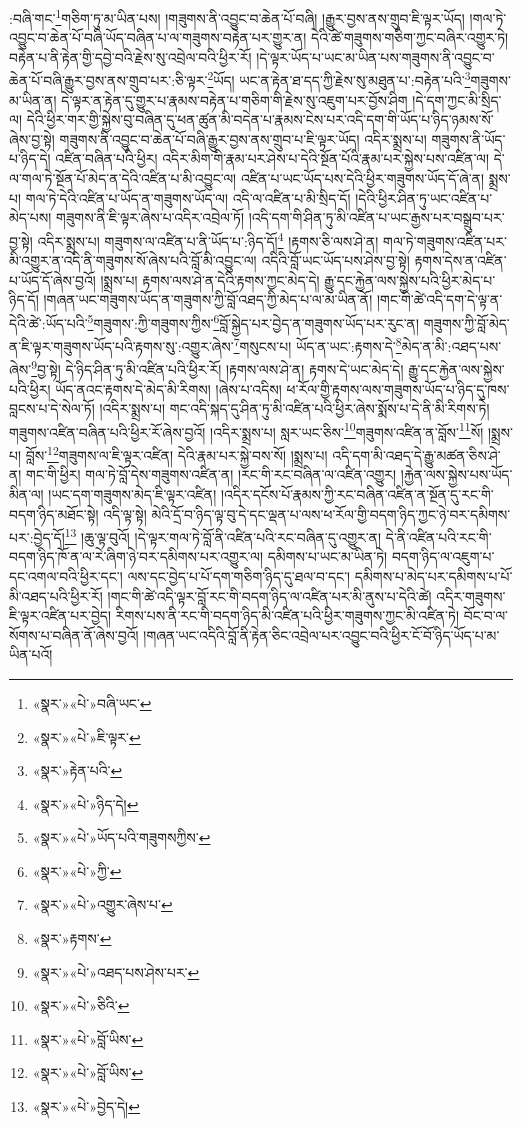 :བཞི་གང་\footnote{«སྣར་»«པེ་»བཞི་ཡང་}གཅིག་ཏུ་མ་ཡིན་པས། །གཟུགས་ནི་འབྱུང་བ་ཆེན་པོ་བཞི། །རྒྱུར་བྱས་ནས་གྲུབ་ཇི་ལྟར་ཡོད། །གལ་ཏེ་འབྱུང་བ་ཆེན་པོ་བཞི་ཡོད་བཞིན་པ་ལ་གཟུགས་བརྟེན་པར་གྱུར་ན། དེའི་ཚེ་གཟུགས་གཅིག་ཀྱང་བཞིར་འགྱུར་ཏེ། བརྟེན་པ་ནི་རྟེན་གྱི་དབྱེ་བའི་རྗེས་སུ་འབྲེལ་བའི་ཕྱིར་རོ། །དེ་ལྟར་ཡོད་པ་ཡང་མ་ཡིན་པས་གཟུགས་ནི་འབྱུང་བ་ཆེན་པོ་བཞི་རྒྱུར་བྱས་ནས་གྲུབ་པར་:ཅི་ལྟར་\footnote{«སྣར་»«པེ་»ཇི་ལྟར་}ཡོད། ཡང་ན་རྟེན་ཐ་དད་ཀྱི་རྗེས་སུ་མཐུན་པ་:བརྟེན་པའི་\footnote{«སྣར་»རྟེན་པའི་}གཟུགས་མ་ཡིན་ན། དེ་ལྟར་ན་རྟེན་དུ་གྱུར་པ་རྣམས་བརྟེན་པ་གཅིག་གི་རྗེས་སུ་འཇུག་པར་བྱོས་ཤིག །དེ་དག་ཀྱང་མི་སྲིད་ལ། དེའི་ཕྱིར་གར་གྱི་སྐྱེས་བུ་བཞིན་དུ་ཕན་ཚུན་མི་བདེན་པ་རྣམས་ངེས་པར་འདི་དག་གི་ཡོད་པ་ཉིད་ཉམས་སོ་ཞེས་བྱ་སྟེ། གཟུགས་ནི་འབྱུང་བ་ཆེན་པོ་བཞི་རྒྱུར་བྱས་ནས་གྲུབ་པ་ཇི་ལྟར་ཡོད། འདིར་སྨྲས་པ། གཟུགས་ནི་ཡོད་པ་ཉིད་དེ། འཛིན་བཞིན་པའི་ཕྱིར། འདིར་མིག་གི་རྣམ་པར་ཤེས་པ་དེའི་སྔོན་པོའི་རྣམ་པར་སྐྱེས་པས་འཛིན་ལ། དེ་ལ་གལ་ཏེ་སྔོན་པོ་མེད་ན་དེའི་འཛིན་པ་མི་འབྱུང་ལ། འཛིན་པ་ཡང་ཡོད་པས་དེའི་ཕྱིར་གཟུགས་ཡོད་དོ་ཞེ་ན། སྨྲས་པ། གལ་ཏེ་དེའི་འཛིན་པ་ཡོད་ན་གཟུགས་ཡོད་ལ། འདི་ལ་འཛིན་པ་མི་སྲིད་དོ། །དེའི་ཕྱིར་ཤིན་ཏུ་ཡང་འཛིན་པ་མེད་པས། གཟུགས་ནི་ཇི་ལྟར་ཞེས་པ་འདིར་འབྲེལ་ཏོ། །འདི་དག་གི་ཤིན་ཏུ་མི་འཛིན་པ་ཡང་རྒྱས་པར་བསྒྲུབ་པར་བྱ་སྟེ། འདིར་སྨྲས་པ། གཟུགས་ལ་འཛིན་པ་ནི་ཡོད་པ་:ཉིད་དོ།\footnote{«སྣར་»«པེ་»ཉིད་དེ།} །རྟགས་ཅི་ལས་ཤེ་ན། གལ་ཏེ་གཟུགས་འཛིན་པར་མི་འགྱུར་ན་འདི་ནི་གཟུགས་སོ་ཞེས་པའི་བློ་མི་འབྱུང་ལ། འདིའི་བློ་ཡང་ཡོད་པས་ཤེས་བྱ་སྟེ། རྟགས་དེས་ན་འཛིན་པ་ཡོད་དོ་ཞེས་བྱའོ། །སྨྲས་པ། རྟགས་ལས་ཤེ་ན་དེའི་རྟགས་ཀྱང་མེད་དེ། རྒྱུ་དང་རྐྱེན་ལས་སྐྱེས་པའི་ཕྱིར་མེད་པ་ཉིད་དོ། །གཞན་ཡང་གཟུགས་ཡོད་ན་གཟུགས་ཀྱི་བློ་འཐད་ཀྱི་མེད་པ་ལ་མ་ཡིན་ནོ། །གང་གི་ཚེ་འདི་དག་དེ་ལྟ་ན་དེའི་ཚེ་:ཡོད་པའི་\footnote{«སྣར་»«པེ་»ཡོད་པའི་གཟུགསཀྱིས་}གཟུགས་:ཀྱི་གཟུགས་ཀྱིས་\footnote{«སྣར་»«པེ་»ཀྱི་}བློ་སྐྱེད་པར་བྱེད་ན་གཟུགས་ཡོད་པར་རུང་ན། གཟུགས་ཀྱི་བློ་མེད་ན་ཇི་ལྟར་གཟུགས་ཡོད་པའི་རྟགས་སུ་:འགྱུར་ཞེས་\footnote{«སྣར་»«པེ་»འགྱུར་ཞེས་པ་}གསུངས་པ། ཡོད་ན་ཡང་:རྟགས་དེ་\footnote{«སྣར་»རྟགས་}མེད་ན་མི་:འཐད་པས་ཞེས་\footnote{«སྣར་»«པེ་»འཐད་པས་ཤེས་པར་}བྱ་སྟེ། དེ་ཉིད་ཤིན་ཏུ་མི་འཛིན་པའི་ཕྱིར་རོ། །རྟགས་ལས་ཤེ་ན། རྟགས་དེ་ཡང་མེད་དེ། རྒྱུ་དང་རྐྱེན་ལས་སྐྱེས་པའི་ཕྱིར། ཡོད་ནའང་རྟགས་དེ་མེད་མི་རིགས། །ཞེས་པ་འདིས། ཕ་རོལ་གྱི་རྟགས་ལས་གཟུགས་ཡོད་པ་ཉིད་དུ་ཁས་བླངས་པ་དེ་སེལ་ཏོ། །འདིར་སྨྲས་པ། གང་འདི་སྐད་དུ་ཤིན་ཏུ་མི་འཛིན་པའི་ཕྱིར་ཞེས་སྨོས་པ་དེ་ནི་མི་རིགས་ཏེ། གཟུགས་འཛིན་བཞིན་པའི་ཕྱིར་རོ་ཞེས་བྱའོ། །འདིར་སྨྲས་པ། སླར་ཡང་ཅིས་\footnote{«སྣར་»«པེ་»ཅིའི་}གཟུགས་འཛིན་ན་བློས་\footnote{«སྣར་»«པེ་»བློ་ཡིས་}སོ། །སྨྲས་པ། བློས་\footnote{«སྣར་»«པེ་»བློ་ཡིས་}གཟུགས་ལ་ཇི་ལྟར་འཛིན། དེའི་རྣམ་པར་སྐྱེ་བས་སོ། །སྨྲས་པ། འདི་དག་མི་འཐད་དེ་རྒྱུ་མཚན་ཅིས་ཤེ་ན། གང་གི་ཕྱིར། གལ་ཏེ་བློ་དེས་གཟུགས་འཛིན་ན། །རང་གི་རང་བཞིན་ལ་འཛིན་འགྱུར། །རྐྱེན་ལས་སྐྱེས་པས་ཡོད་མིན་ལ། །ཡང་དག་གཟུགས་མེད་ཇི་ལྟར་འཛིན། །འདིར་དངོས་པོ་རྣམས་ཀྱི་རང་བཞིན་འཛིན་ན་སྔོན་དུ་རང་གི་བདག་ཉིད་མཐོང་སྟེ། འདི་ལྟ་སྟེ། མེའི་དྲོ་བ་ཉིད་ལྟ་བུ་དེ་དང་ལྡན་པ་ལས་ཕ་རོལ་གྱི་བདག་ཉིད་ཀྱང་ཉེ་བར་དམིགས་པར་:བྱེད་དོ།\footnote{«སྣར་»«པེ་»བྱེད་དེ།} །ཆུ་ལྟ་བུའོ། །དེ་ལྟར་གལ་ཏེ་བློ་ནི་འཛིན་པའི་རང་བཞིན་དུ་འགྱུར་ན། དེ་ནི་འཛིན་པའི་རང་གི་བདག་ཉིད་ཁོ་ན་ལ་རེ་ཞིག་ཉེ་བར་དམིགས་པར་འགྱུར་ལ། དམིགས་པ་ཡང་མ་ཡིན་ཏེ། བདག་ཉིད་ལ་འཇུག་པ་དང་འགལ་བའི་ཕྱིར་དང་། ལས་དང་བྱེད་པ་པོ་དག་གཅིག་ཉིད་དུ་ཐལ་བ་དང་། དམིགས་པ་མེད་པར་དམིགས་པ་པོ་མི་འཐད་པའི་ཕྱིར་རོ། །གང་གི་ཚེ་འདི་ལྟར་བློ་རང་གི་བདག་ཉིད་ལ་འཛིན་པར་མི་ནུས་པ་དེའི་ཚེ། འདིར་གཟུགས་ཇི་ལྟར་འཛིན་པར་བྱེད། རིགས་པས་ནི་རང་གི་བདག་ཉིད་མི་འཛིན་པའི་ཕྱིར་གཟུགས་ཀྱང་མི་འཛིན་ཏེ། བོང་བ་ལ་སོགས་པ་བཞིན་ནོ་ཞེས་བྱའོ། །གཞན་ཡང་འདིའི་བློ་ནི་རྟེན་ཅིང་འབྲེལ་པར་འབྱུང་བའི་ཕྱིར་ངོ་བོ་ཉིད་ཡོད་པ་མ་ཡིན་པའོ། 